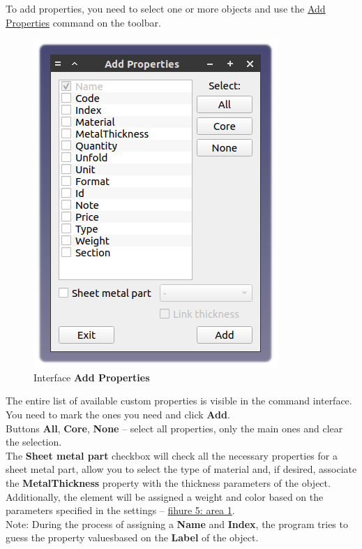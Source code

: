 \documentclass[a4paper,12pt]{article}
\begin{document}
To add properties, you need to select one or more objects and use the \hyperref[sec:5]{Add Properties} command on the toolbar.

\begin{figure}[htp]
	\centering
	\includegraphics[scale=1]{img/properties_add.png}
	\caption{Interface \textbf{Add Properties}}
	\label{sec:properties_add}
\end{figure}

The entire list of available custom properties is visible in the command interface. You need to mark the ones you need and click \textbf{Add}.\\

Buttons \textbf{All}, \textbf{Core}, \textbf{None} -- select all properties, only the main ones and clear the selection.\\

The \textbf{Sheet metal part} checkbox will check all the necessary properties for a sheet metal part, allow you to select the type of material and, if desired, associate the \textbf{MetalThickness} property with the thickness parameters of the object. Additionally, the element will be assigned a weight and color based on the parameters specified in the settings -- \hyperref[sec:pref_sm]{fihure 5: area 1}.\\

Note: During the process of assigning a \textbf{Name} and \textbf{Index}, the program tries to guess the property values ​​based on the \textbf{Label} of the object.
\end{document}
